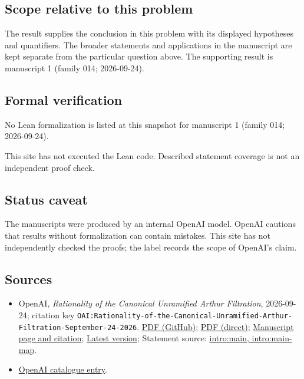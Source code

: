 \documentclass[11pt]{article}
\begin{document}
\subsection{Scope relative to this problem}
The result supplies the conclusion in this problem with its displayed hypotheses and quantifiers. The broader statements and applications in the manuscript are kept separate from the particular question above. The supporting result is manuscript 1 (family 014; 2026-09-24).

\subsection{Formal verification}
No Lean formalization is listed at this snapshot for manuscript 1 (family 014; 2026-09-24).

This site has not executed the Lean code. Described statement coverage is not an independent proof check.

\subsection{Status caveat}
The manuscripts were produced by an internal OpenAI model. OpenAI cautions that results without formalization can contain mistakes. This site has not independently checked the proofs; the label records the scope of OpenAI's claim.

\subsection{Sources}
\begin{itemize}
\item OpenAI, \emph{Rationality of the Canonical Unramified Arthur Filtration}, 2026-09-24; citation key \texttt{OAI:Rationality-of-the-Canonical-Unramified-Arthur-Filtration-September-24-2026}. \href{https://github.com/openai/math/blob/adc7f1241b42e322a6451854ab7e4b4c146bf78a/preprints/Rationality-of-the-Canonical-Unramified-Arthur-Filtration-September-24-2026/paper.pdf}{PDF (GitHub)}; \href{https://github.com/openai/math/raw/adc7f1241b42e322a6451854ab7e4b4c146bf78a/preprints/Rationality-of-the-Canonical-Unramified-Arthur-Filtration-September-24-2026/paper.pdf}{PDF (direct)}; \href{https://github.com/openai/math/blob/adc7f1241b42e322a6451854ab7e4b4c146bf78a/preprints/Rationality-of-the-Canonical-Unramified-Arthur-Filtration-September-24-2026/README.md}{Manuscript page and citation}; \href{https://github.com/openai/math/blob/main/preprints/Rationality-of-the-Canonical-Unramified-Arthur-Filtration-September-24-2026/paper.pdf}{Latest version}; Statement source: \href{https://github.com/openai/math/blob/adc7f1241b42e322a6451854ab7e4b4c146bf78a/preprints/Rationality-of-the-Canonical-Unramified-Arthur-Filtration-September-24-2026/build/sections/01-introduction.tex\#L118}{intro:main, intro:main-map}.
\item \href{https://github.com/openai/math/blob/adc7f1241b42e322a6451854ab7e4b4c146bf78a/CONTENTS.md}{OpenAI catalogue entry}.
\end{itemize}
\end{document}

